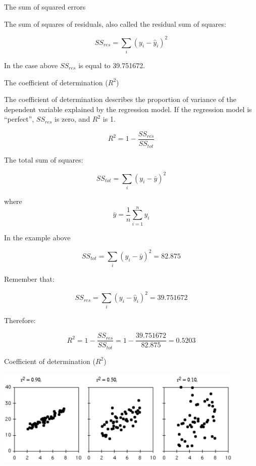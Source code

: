 \documentclass{beamer}
\begin{document}
\begin{frame}
{\centerline{The sum of squared errors}}

The sum of squares of residuals, also called the residual sum of squares:

$$SS_{res} = \sum_i (y_i - \hat{y}_i)^2$$

In the case above $SS_{res}$ is equal to 39.751672.

\end{frame}

\begin{frame}
{\centerline{The coefficient of determination ($R^2$)}}

The coefficient of determination describes the proportion of variance of the dependent variable explained by the regression model. If the regression model is “perfect”, $SS_{res}$ is zero, and $R^2$ is 1.

$$R^2 = 1 - \frac{SS_{res}}{SS_{tot}}$$

The total sum of squares:

$$SS_{tot} = \sum_i (y_i - \bar{y})^2$$

where 
$$\bar{y}=\frac{1}{n}\sum_{i=1}^n y_i$$

\end{frame}

\begin{frame}
{\centerline{In the example above}}

$$SS_{tot} = \sum_i (y_i - \bar{y})^2 = 82.875 $$

Remember that:

$$SS_{res} = \sum_i (y_i - \hat{y}_i)^2 = 39.751672$$

Therefore:

$$R^2 = 1 - \frac{SS_{res}}{SS_{tot}} = 1 - \frac{39.751672}{82.875} =  0.5203$$

\end{frame}

\begin{frame}
{\centerline{Coefficient of determination ($R^2$)}}


\begin{center}
\includegraphics[width=12cm]{P2023.AIBCCSS.FoundationsDataScience/r2.png}   
\end{center}
\end{frame}
\end{document}
